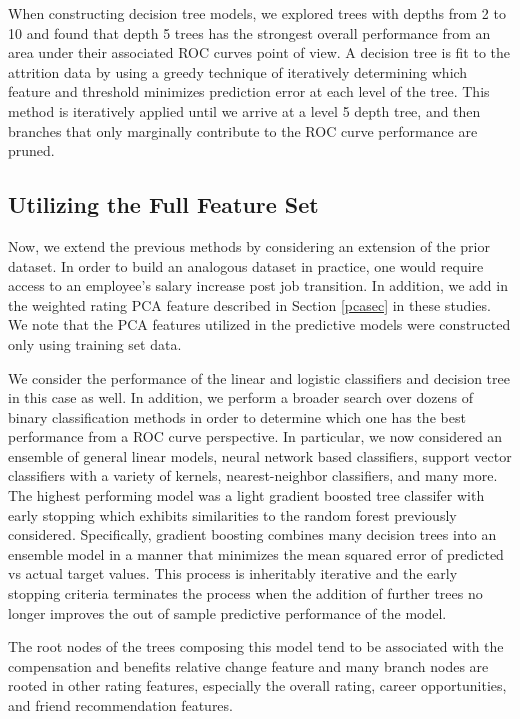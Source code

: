 \documentclass[10pt]{article}
\begin{document}
When constructing decision tree models, we explored trees with depths from 2 to 10 and 
found that depth 5 trees has the strongest overall performance from an area under their 
associated ROC curves point of view. 
A decision tree is fit to the attrition data by using a greedy technique of 
iteratively determining which feature and threshold minimizes prediction error 
at each level of the tree.  This method is iteratively applied until we arrive 
at a level 5 depth tree, and then branches that only marginally contribute to
the ROC curve performance are pruned.  

\subsection{Utilizing the Full Feature Set} 
\hspace{\parindent}
Now, we extend the previous methods by considering an extension of the 
prior dataset.  In order to build an analogous dataset in practice, one would require access to 
an employee's salary increase post job transition.
In addition, we add in the weighted rating PCA feature 
described in Section \ref{pcasec} in these studies.  We note that the 
PCA features utilized in the predictive models were constructed only using training set data.

We consider the performance of the linear and logistic classifiers and decision tree in this 
case as well. In addition, we perform a broader search over dozens of binary classification 
methods in order to determine which one has the best performance from a ROC curve perspective. 
In particular, we now considered an ensemble of general linear models, neural network based 
classifiers, support vector classifiers with a variety of kernels, nearest-neighbor classifiers, and many more.
The highest performing model was a light gradient boosted tree classifer with 
early stopping which exhibits similarities to the random forest 
previously considered.  Specifically, gradient boosting combines many decision 
trees into an ensemble model in a manner that minimizes the mean squared 
error of predicted vs actual target values.  This process is inheritably iterative 
and the early stopping criteria terminates the process when the addition of 
further trees no longer improves the out of sample predictive performance of the model.

The root nodes of the trees composing this model tend to be associated with the 
compensation and benefits relative change feature and many branch nodes 
are rooted in other rating features, especially the overall rating, 
career opportunities, and friend recommendation features.
\end{document}
